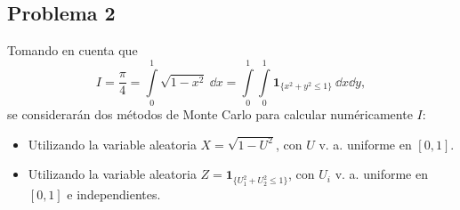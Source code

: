 \subsection*{Problema 2}

Tomando en cuenta que
\[I=\frac{\pi }{4}=\int\limits_{0}^{1}\sqrt{1-x^{2}}\ \dd x=\int\limits_{0}^{1}\int\limits_{0}^{1}\mathbf{1}_{\{x^{2}+y^{2}\leq 1\}}\ \dd x \dd y,\]
se considerar\'{a}n dos m\'{e}todos de Monte Carlo para calcular num\'{e}ricamente $I$:
\begin{itemize}
  \item Utilizando la variable aleatoria $X=\sqrt{1-U^{2}}$, con $U$ v. a. uniforme en $[0,1].$
  \item Utilizando la variable aleatoria $Z=\mathbf{1}_{\{U_{1}^{2}+U_{2}^{2}\leq 1\}}$, con $U_{i}$ v. a. uniforme en $[0,1]$ e independientes.
\end{itemize}


